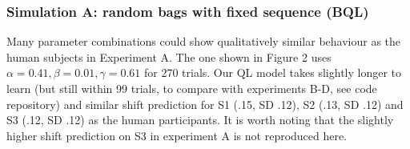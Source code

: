\documentclass[10pt,letterpaper]{article}
\begin{document}
\subsubsection{Simulation A: random bags with fixed sequence (BQL)}

Many parameter combinations could show qualitatively similar behaviour as the human subjects in Experiment A. The one shown in Figure 2 uses $\alpha = 0.41, \beta = 0.01, \gamma = 0.61$ for 270 trials. Our QL model takes slightly longer to learn (but still within 99 trials, to compare with experiments B-D, see code repository) and similar shift prediction for S1 (.15, SD .12), S2 (.13, SD .12) and S3 (.12, SD .12) as the human participants. It is worth noting that the slightly higher shift prediction on S3 in experiment A is not reproduced here.

\end{document}
